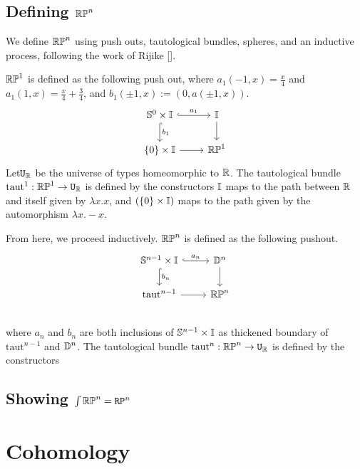 \documentclass{amsart}
\begin{document}
\subsection{Defining $\mathbb{RP}^n$}
We define $\mathbb{RP}^n$ using push outs, tautological bundles, spheres, and an inductive process, following the work of Rijike [].

$\mathbb{RP}^1$ is defined as the following push out, where $a_1(-1,x) = \frac{x}{4}$ and $a_1(1,x)= \frac{x}{4} + \frac{3}{4}$, and $b_1 (\pm 1, x) := (0, a(\pm1, x))$.\\
\[\begin{tikzcd}
\set{S}^0 \times \set{I} \arrow[r, hook, "a_1"] \arrow[d, hook, "b_1" ] & \set{I} \arrow[d]\\
\{0 \} \times \set{I} \arrow[r] & \set{RP}^1
\end{tikzcd}
\]
Let$\mathtt{U}_{\mathbb{R}}$ be the universe of types homeomorphic to $\mathbb{R}$. The tautological bundle $\text{taut}^1: \mathbb{RP}^1 \rightarrow \mathtt{U}_{\mathbb{R}}$ is defined by the constructors $\mathbb{I}$ maps to the path between $\mathbb{R}$ and itself given by $\lambda x. x$, and $(\{0\} \times \mathbb{I})$ maps to the path given by the automorphism $\lambda x . -x$.

From here, we proceed inductively. $\mathbb{RP}^n$ is defined as the following pushout.\\
\[\begin{tikzcd}
\set{S}^{n-1} \times \set{I} \arrow[r, hook, "a_n"] \arrow[d, hook, "b_n" ] &\set{D}^{n} \arrow[d]\\
\text{taut}^{n-1} \arrow[r] &\set{RP}^n\\
\end{tikzcd}
\] where $a_n$ and $b_n$ are both inclusions of $\mathbb{S}^{n-1} \times \mathbb{I} $ as thickened boundary of $\text{taut}^{n-1}$ and $\mathbb{D}^{n}$. The tautological bundle $\text{taut}^n: \mathbb{RP}^n \rightarrow \mathtt{U}_{\mathbb{R}}$ is defined by the constructors 


\subsection{Showing $ \int \mathbb{RP}^n = \mathtt{RP}^n $}


\section{Cohomology}
\label{sec:cohom}
\end{document}

